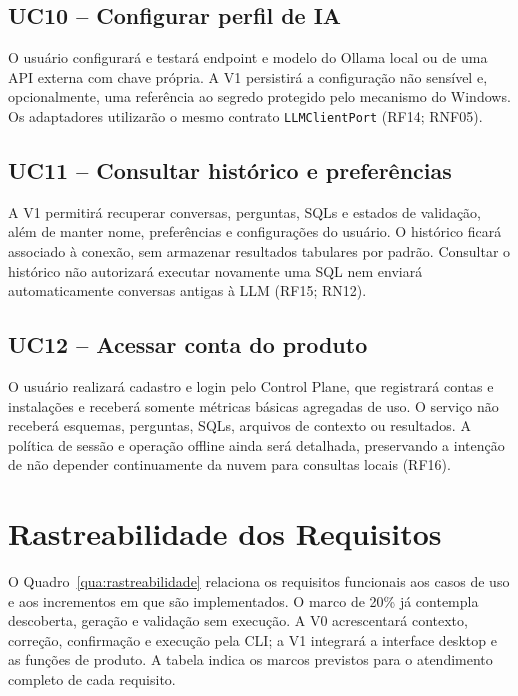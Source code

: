 \begin{apendicesenv}
\subsection{UC10 -- Configurar perfil de IA}

O usuário configurará e testará endpoint e modelo do Ollama local ou de uma API externa com chave própria. A V1 persistirá a configuração não sensível e, opcionalmente, uma referência ao segredo protegido pelo mecanismo do Windows. Os adaptadores utilizarão o mesmo contrato \texttt{LLMClientPort} (RF14; RNF05).

\subsection{UC11 -- Consultar histórico e preferências}

A V1 permitirá recuperar conversas, perguntas, SQLs e estados de validação, além de manter nome, preferências e configurações do usuário. O histórico ficará associado à conexão, sem armazenar resultados tabulares por padrão. Consultar o histórico não autorizará executar novamente uma SQL nem enviará automaticamente conversas antigas à LLM (RF15; RN12).

\subsection{UC12 -- Acessar conta do produto}

O usuário realizará cadastro e login pelo Control Plane, que registrará contas e instalações e receberá somente métricas básicas agregadas de uso. O serviço não receberá esquemas, perguntas, SQLs, arquivos de contexto ou resultados. A política de sessão e operação offline ainda será detalhada, preservando a intenção de não depender continuamente da nuvem para consultas locais (RF16).

\section{Rastreabilidade dos Requisitos}
\label{ap:rastreabilidade}

O Quadro~\ref{qua:rastreabilidade} relaciona os requisitos funcionais aos casos de uso e aos incrementos em que são implementados. O marco de 20\% já contempla descoberta, geração e validação sem execução. A V0 acrescentará contexto, correção, confirmação e execução pela CLI; a V1 integrará a interface desktop e as funções de produto. A tabela indica os marcos previstos para o atendimento completo de cada requisito.


\end{apendicesenv}
